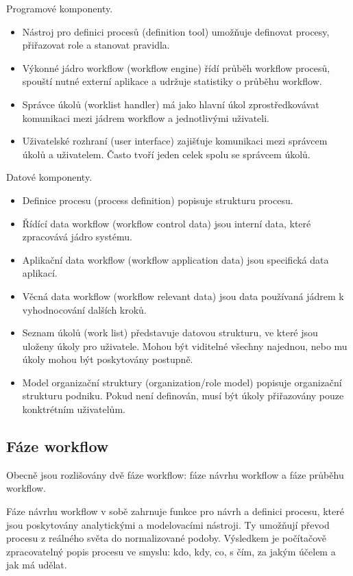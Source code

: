 \documentclass{fithesis}
\begin{document}
Programové komponenty.

\begin{itemize}
\item Nástroj pro definici procesů (definition tool) umožňuje definovat procesy, přiřazovat role a stanovat pravidla.
\item Výkonné jádro workflow (workflow engine) řídí průběh workflow procesů, spouští nutné externí aplikace a udržuje statistiky o průběhu workflow.
\item Správce úkolů (worklist handler) má jako hlavní úkol zprostředkovávat komunikaci mezi jádrem workflow a jednotlivými uživateli.
\item Uživatelské rozhraní (user interface) zajišťuje komunikaci mezi správcem úkolů a uživatelem. Často tvoří jeden celek spolu se správcem úkolů.
\end{itemize}

Datové komponenty.

\begin{itemize}
\item Definice procesu (process definition) popisuje strukturu procesu.
\item Řídící data workflow (workflow control data) jsou interní data, které zpracovává jádro systému.
\item Aplikační data workflow (workflow application data) jsou specifická data aplikací.
\item Věcná data workflow (workflow relevant data) jsou data používaná jádrem k vyhodnocování dalších kroků.
\item Seznam úkolů (work list) představuje datovou strukturu, ve které jsou uloženy úkoly pro uživatele. Mohou být viditelné všechny najednou, nebo mu úkoly mohou být poskytovány postupně.
\item Model organizační struktury (organization/role model) popisuje organizační strukturu podniku. Pokud není definován, musí být úkoly přiřazovány pouze konktrétním uživatelům.
\end{itemize}

\subsection{Fáze workflow}
Obecně jsou rozlišovány dvě fáze workflow: fáze návrhu workflow a fáze průběhu workflow. \cite{workflow}

Fáze návrhu workflow v sobě zahrnuje funkce pro návrh a definici procesu, které jsou poskytovány analytickými a modelovacími nástroji. Ty umožňují převod procesu z reálného světa do normalizované podoby. Výsledkem je počítačově zpracovatelný popis procesu ve smyslu: kdo, kdy, co, s čím, za jakým účelem a jak má udělat.
\end{document}

